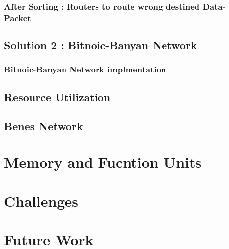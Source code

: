 \documentclass{beamer}
\begin{document}
	\subsubsection{After Sorting : Routers to route wrong destined Data-Packet}
      
	\subsection{Solution 2 : Bitnoic-Banyan Network}
    	
	\subsubsection{Bitnoic-Banyan Network implmentation}
	
      \subsection{Resource Utilization}
	  
      
  \subsection{Benes Network}
		

\section{Memory and Fucntion Units}
  
  
\section{Challenges}
  
  
\section{Future Work}
  
  
\end{document}
